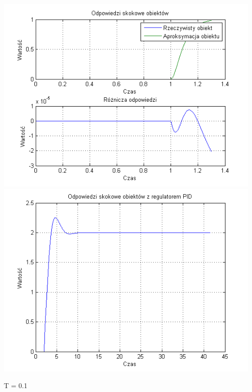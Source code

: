 \documentclass[10pt,a4paper]{article}
\begin{document}
\begin{center}
\includegraphics[scale=1]{images/dwa/skrypt_47.png}\\
\includegraphics[scale=1]{images/dwa/skrypt_48.png}\\
\end{center}
\newpage
T = 0.1
\end{document}
